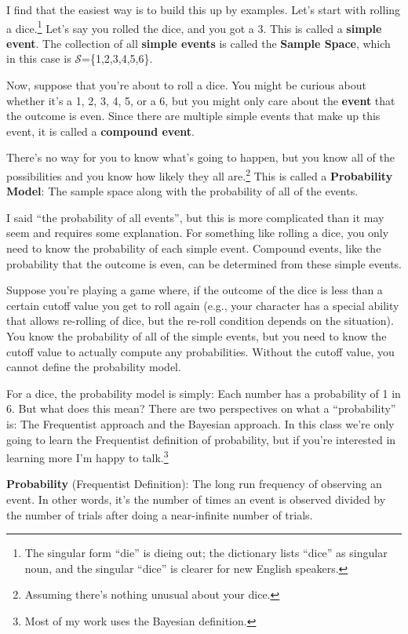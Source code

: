 \documentclass[
  letterpaper,
  DIV=11,
  numbers=noendperiod,
  oneside]{scrreprt}
\begin{document}
I find that the easiest way is to build this up by examples. Let's start
with rolling a dice.\footnote{The singular form ``die'' is dieing out;
  the dictionary lists ``dice'' as singular noun, and the singular
  ``dice'' is clearer for new English speakers.} Let's say you rolled
the dice, and you got a 3. This is called a \textbf{simple event}. The
collection of all \textbf{simple events} is called the \textbf{Sample
Space}, which in this case is \(\mathcal S\)=\{1,2,3,4,5,6\}.

Now, suppose that you're about to roll a dice. You might be curious
about whether it's a 1, 2, 3, 4, 5, or a 6, but you might only care
about the \textbf{event} that the outcome is even. Since there are
multiple simple events that make up this event, it is called a
\textbf{compound event}.

There's no way for you to know what's going to happen, but you know all
of the possibilities and you know how likely they all are.\footnote{Assuming
  there's nothing unusual about your dice.} This is called a
\textbf{Probability Model}: The sample space along with the probability
of all of the events.

I said ``the probability of all events'', but this is more complicated
than it may seem and requires some explanation. For something like
rolling a dice, you only need to know the probability of each simple
event. Compound events, like the probability that the outcome is even,
can be determined from these simple events.

Suppose you're playing a game where, if the outcome of the dice is less
than a certain cutoff value you get to roll again (e.g., your character
has a special ability that allows re-rolling of dice, but the re-roll
condition depends on the situation). You know the probability of all of
the simple events, but you need to know the cutoff value to actually
compute any probabilities. Without the cutoff value, you cannot define
the probability model.

For a dice, the probability model is simply: Each number has a
probability of 1 in 6. But what does this mean? There are two
perspectives on what a ``probability'' is: The Frequentist approach and
the Bayesian approach. In this class we're only going to learn the
Frequentist definition of probability, but if you're interested in
learning more I'm happy to talk.\footnote{Most of my work uses the
  Bayesian definition.}

\textbf{Probability} (Frequentist Definition): The long run frequency of
observing an event. In other words, it's the number of times an event is
observed divided by the number of trials after doing a near-infinite
number of trials.
\end{document}

